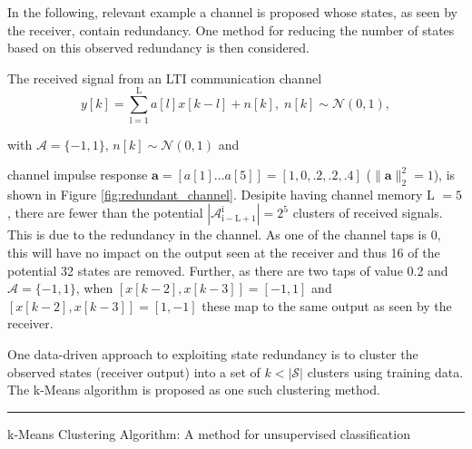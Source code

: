 In the following, relevant example a channel is proposed whose states, as seen by the receiver, contain redundancy. One method for reducing the number of states based on this observed redundancy is then considered. 

The received signal from an LTI communication channel
\begin{equation*}
y[k] = \sum_{\mathrm{l=1}}^{\mathrm{L}} a[l]x[k-l] + n[k], \; n[k]  \sim \mathcal{N}(0,1),
\end{equation*}

with  $\mathcal{A}=\{-1, 1\}$, $n[k]  \sim \mathcal{N}(0,1)$ and 

channel impulse response $\mathbf{a} = [a[1]...a[5]]=[1, 0, .2, .2, .4]$ ($\|\mathbf{a}\|^2_2 = 1$),  is shown in Figure \ref{fig:redundant_channel}. Desipite having channel memory L $=5$, there are fewer than the potential $|\mathcal{A}_{\mathrm{i-L+1}}^{\mathrm{i}}| =2^5$ clusters of received signals. This is due to the redundancy in the channel.  As one of the channel taps is 0, this will have no impact on the output seen at the receiver and thus 16 of the potential 32 states are removed. Further, as there are two taps of value 0.2 and $\mathcal{A}=\{-1, 1\}$, when $\left[x[k-2],x[k-3]\right] = [-1,1]$ and $\left[x[k-2],x[k-3]\right] = [1,-1]$ these map to the same output as seen by the receiver. 


\par
One data-driven approach to exploiting state redundancy is to cluster the observed states (receiver output) into a set of $k<|\mathcal{S}|$ clusters using training data. The k-Means algorithm is proposed as one such clustering method.
\\

    \noindent\rule[16pt]{\textwidth}{0.6pt}
k-Means Clustering Algorithm: A method for unsupervised classification

